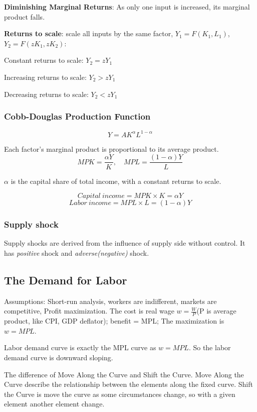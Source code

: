 \documentclass[10pt, a4paper]{article}
\begin{document}
            \textbf{Diminishing Marginal Returns}: As only one input is increased, its marginal product falls.

            \textbf{Returns to scale}: scale all inputs by the same factor, $Y_1 = F(K_1, L_1)$, $Y_2 = F(zK_1, zK_2)$: 

            {Constant returns to scale}: $Y_2 = zY_1$
            
            {Increasing returns to scale}: $Y_2 > zY_1$

            {Decreasing returns to scale}: $Y_2 < zY_1$
            
            \subsubsection{Cobb-Douglas Production Function} 
            $$Y = AK^{\alpha}L^{1 - \alpha}$$

            Each factor's marginal product is proportional to its average product. 
            $$MPK = \frac{\alpha Y}{K}, \quad MPL = \frac{(1 - \alpha) Y}{L}$$

            $\alpha$ is the capital share of total income, with a constant returns to scale.

            $$Capital\ income = MPK \times K = \alpha Y$$
            $$Labor\ income = MPL \times L = (1 - \alpha)Y$$

            \subsubsection{Supply shock}
                Supply shocks are derived from the influence of supply side without control. It has \emph{positive} shock and \emph{adverse(negative)} shock.

        \subsection{The Demand for Labor}
            Assumptions: Short-run analysis, workers are indifferent, markets are competitive, Profit maximization. The cost is real wage $w = \frac{W}{P}$(P is average product, like CPI, GDP deflator); benefit = MPL; The maximization is $w = MPL$.

            Labor demand curve is exactly the MPL curve as $w = MPL$. So the labor demand curve is downward sloping. 

            The difference of Move Along the Curve and Shift the Curve. Move Along the Curve describe the relationship between the elements along the fixed curve. Shift the Curve is move the curve as some circumstances change, so with a given element another element change.
\end{document}
